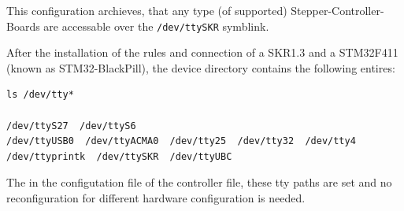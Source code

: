 This configuration archieves, that any type (of supported)
Stepper-Controller-Boards are accessable over the
\passthrough{\lstinline!/dev/ttySKR!} symblink.

After the installation of the rules and connection of a SKR1.3 and a
STM32F411 (known as STM32-BlackPill), the device directory contains the
following entires:

\begin{lstlisting}
ls /dev/tty*

/dev/ttyS27  /dev/ttyS6
/dev/ttyUSB0  /dev/ttyACMA0  /dev/tty25  /dev/tty32  /dev/tty4  /dev/ttyprintk  /dev/ttySKR  /dev/ttyUBC
\end{lstlisting}

The in the configutation file of the controller file, these tty paths
are set and no reconfiguration for different hardware configuration is
needed.
